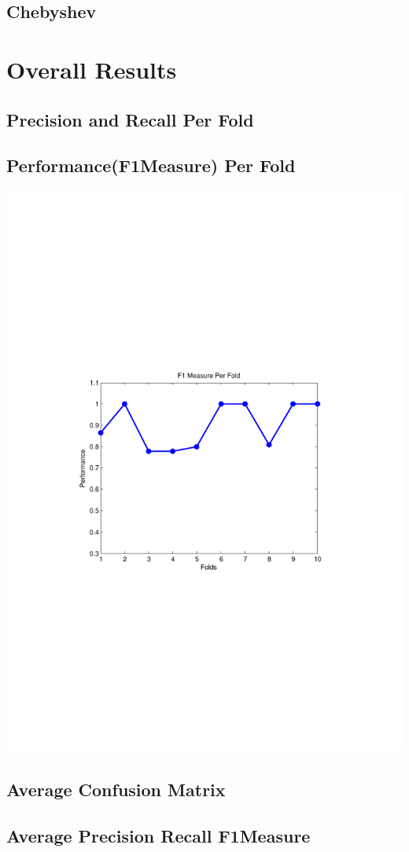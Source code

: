 \documentclass[a4paper,11pt]{article}
\begin{document}
\subsection{Chebyshev}

\section{Overall Results}

\subsection{Precision and Recall Per Fold}

\subsection{Performance(F1Measure) Per Fold}
\includegraphics[width=.5\textwidth]{measure_per_fold.pdf}

\subsection{Average Confusion Matrix}

\subsection{Average Precision Recall F1Measure}
\end{document}
